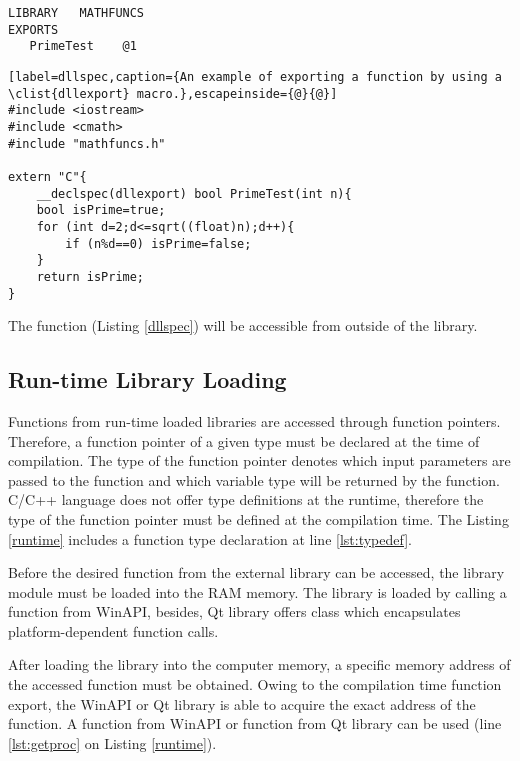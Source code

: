 \begin{lstlisting}[label=DEF,caption={A \clist{Module Definition File} of a library called ``Mathfuncs'' including a function called ``PrimeTest''.}]
LIBRARY   MATHFUNCS
EXPORTS
   PrimeTest	@1
\end{lstlisting}


\begin{lstlisting}[label=dllspec,caption={An example of exporting a function by using a \clist{dllexport} macro.},escapeinside={@}{@}]
#include <iostream>
#include <cmath>
#include "mathfuncs.h"

extern "C"{
	__declspec(dllexport) bool PrimeTest(int n){
	bool isPrime=true;
	for (int d=2;d<=sqrt((float)n);d++){
		if (n%d==0) isPrime=false;
	}
	return isPrime;
}
\end{lstlisting}

The function  (Listing \ref{dllspec}) will be accessible from outside of the library.

\subsection{Run-time Library Loading}

\label{sec:runtimeloading}

Functions from run-time loaded libraries are accessed through function pointers\cite{msdn}. Therefore, a function pointer of a given type must be declared at the time of compilation. The type of the function pointer denotes which input parameters are passed to the function and which variable type will be returned by the function. C/C++ language does not offer type definitions at the runtime, therefore the type of the function pointer must be defined at the compilation time. The Listing \ref{runtime} includes a function type declaration at line \ref{lst:typedef}.

Before the desired function from the external library can be accessed, the library module must be loaded into the RAM memory. The library is loaded by calling a  function from WinAPI, besides, Qt library offers  class which encapsulates platform-dependent function calls.

After loading the library into the computer memory, a specific memory address of the accessed function must be obtained. Owing to the compilation time function export, the WinAPI or Qt library is able to acquire the exact address of the function. A  function from WinAPI or  function from Qt library can be used (line \ref{lst:getproc} on Listing \ref{runtime}).

